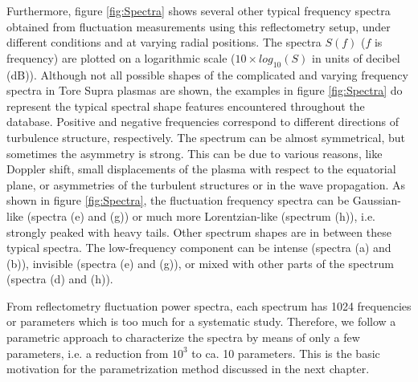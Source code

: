 Furthermore, figure \ref{fig:Spectra} shows several other typical frequency spectra obtained from fluctuation measurements using this reflectometry setup, under different conditions and at varying radial positions. The spectra $S(f)$ ($f$ is frequency) are plotted on a logarithmic scale ($10 \times log_{10}(S)$ in units of decibel (dB)). Although not all possible shapes of the complicated and varying frequency spectra in Tore Supra plasmas are shown, the examples in figure \ref{fig:Spectra} do represent the typical spectral shape features encountered throughout the database. Positive and negative frequencies correspond to different directions of turbulence structure, respectively. The spectrum can be almost symmetrical, but sometimes the asymmetry is strong. This can be due to various reasons, like Doppler shift, small displacements of the plasma with respect to the equatorial plane, or asymmetries of the turbulent structures or in the wave propagation. As shown in figure \ref{fig:Spectra}, the fluctuation frequency spectra can be Gaussian-like (spectra (e) and (g)) or much more Lorentzian-like (spectrum (h)), i.e. strongly peaked with heavy tails. Other spectrum shapes are in between these typical spectra. The low-frequency component can be intense (spectra (a) and (b)), invisible (spectra (e) and (g)), or mixed with other parts of the spectrum (spectra (d) and (h)).


From reflectometry fluctuation power spectra, each spectrum has 1024 frequencies or parameters which is too much for a systematic study. Therefore, we follow a parametric approach to characterize the spectra by means of only a few parameters, i.e. a reduction from $10^3$ to ca. 10 parameters. This is the basic motivation for the parametrization method discussed in the next chapter.


